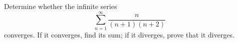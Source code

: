 Determine whether the infinite series
\[
\sum_{n=1}^{\infty}\dfrac{n}{(n+1)(n+2)}
\]
converges. If it converges, find its sum; if it diverges, prove that it diverges.
